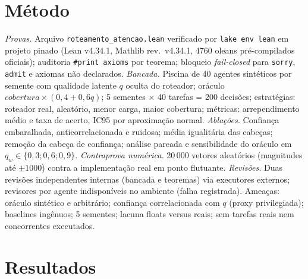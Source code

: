 \documentclass[12pt,a4paper]{article}
\begin{document}
\section{Método}

\textit{Provas.} Arquivo \texttt{roteamento\_atencao.lean} verificado por
\texttt{lake env lean} em projeto pinado (Lean v4.34.1, Mathlib rev.\
v4.34.1, 4760 oleans pré-compilados oficiais); auditoria \texttt{\#print
axioms} por teorema; bloqueio \textit{fail-closed} para \texttt{sorry},
\texttt{admit} e axiomas não declarados. \textit{Bancada.} Piscina de 40
agentes sintéticos por semente com qualidade latente $q$ oculta do roteador;
oráculo $cobertura\times(0{,}4+0{,}6q)$; 5 sementes $\times$ 40 tarefas = 200
decisões; estratégias: roteador real, aleatório, menor carga, maior cobertura;
métricas: arrependimento médio e taxa de acerto, IC95 por aproximação normal.
\textit{Ablações.} Confiança embaralhada, anticorrelacionada e ruidosa; média
igualitária das cabeças; remoção da cabeça de confiança; análise pareada e
sensibilidade do oráculo em $q_w\in\{0{,}3;0{,}6;0{,}9\}$.
\textit{Contraprova numérica.} 20\,000 vetores aleatórios (magnitudes até
$\pm1000$) contra a implementação real em ponto flutuante.
\textit{Revisões.} Duas revisões independentes internas (bancada e teoremas)
via executores externos; revisores por agente indisponíveis no ambiente
(falha registrada). Ameaças: oráculo sintético e arbitrário; confiança
correlacionada com $q$ (proxy privilegiada); baselines ingênuos; 5 sementes;
lacuna floats versus reais; sem tarefas reais nem concorrentes executados.

\section{Resultados}
\end{document}
